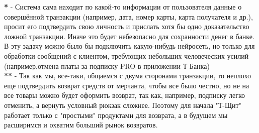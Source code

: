 \documentclass[12pt,a4paper]{article}
\begin{document}
\textbf{*} - Система сама находит по какой-то информации от пользователя данные о совершённой транзакции (например, дата, номер карты, карта получателя и др.), просит его подтвердить свою личность и прислать хотя бы одно доказательство ложной транзакции. Иначе это будет небезопасно для сохранности денег в банке. В эту задачу можно было бы подключить какую-нибудь нейросеть, но только для обработки сообщений с клиентом, требующих небольших человеческих усилий (например,отмена платы за подписку PRO в приложении Т-Банка)\\

\textbf{**} - Так как мы, все-таки, общаемся с двумя сторонами транзакции, то неплохо еще подтвердить возврат средств от мерчанта, чтобы все было честно, но не на все товары можно будет оформить возврат, так как, например, подписку легко отменить, а вернуть условный рюкзак сложнее. Поэтому для начала "Т-Щит" \vspace{} работает только с "простыми" продуктами для возврата, а в будущем мы расширимся и охватим больший рынок возвратов.
\end{document}
